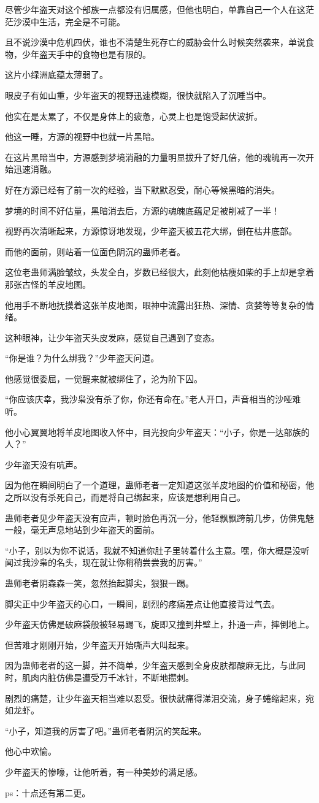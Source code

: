 \begin{this_body}
尽管少年盗天对这个部族一点都没有归属感，但他也明白，单靠自己一个人在这茫茫沙漠中生活，完全是不可能。

且不说沙漠中危机四伏，谁也不清楚生死存亡的威胁会什么时候突然袭来，单说食物，少年盗天手中的食物也是有限的。

这片小绿洲底蕴太薄弱了。

眼皮子有如山重，少年盗天的视野迅速模糊，很快就陷入了沉睡当中。

他实在是太累了，不仅是身体上的疲惫，心灵上也是饱受起伏波折。

他这一睡，方源的视野中也就一片黑暗。

在这片黑暗当中，方源感到梦境消融的力量明显拔升了好几倍，他的魂魄再一次开始迅速消融。

好在方源已经有了前一次的经验，当下默默忍受，耐心等候黑暗的消失。

梦境的时间不好估量，黑暗消去后，方源的魂魄底蕴足足被削减了一半！

视野再次清晰起来，方源惊讶地发现，少年盗天被五花大绑，倒在枯井底部。

而他的面前，则站着一位面色阴沉的蛊师老者。

这位老蛊师满脸皱纹，头发全白，岁数已经很大，此刻他枯瘦如柴的手上却是拿着那张古怪的羊皮地图。

他用手不断地抚摸着这张羊皮地图，眼神中流露出狂热、深情、贪婪等等复杂的情绪。

这种眼神，让少年盗天头皮发麻，感觉自己遇到了变态。

“你是谁？为什么绑我？”少年盗天问道。

他感觉很委屈，一觉醒来就被绑住了，沦为阶下囚。

“你应该庆幸，我沙枭没有杀了你，你还有命在。”老人开口，声音相当的沙哑难听。

他小心翼翼地将羊皮地图收入怀中，目光投向少年盗天：“小子，你是一达部族的人？”

少年盗天没有吭声。

因为他在瞬间明白了一个道理，蛊师老者一定知道这张羊皮地图的价值和秘密，他之所以没有杀死自己，而是将自己绑起来，应该是想利用自己。

蛊师老者见少年盗天没有应声，顿时脸色再沉一分，他轻飘飘跨前几步，仿佛鬼魅一般，毫无声息地站到少年盗天的面前。

“小子，别以为你不说话，我就不知道你肚子里转着什么主意。嘿，你大概是没听闻过我沙枭的名头，现在就让你稍稍尝尝我的厉害。”

蛊师老者阴森森一笑，忽然抬起脚尖，狠狠一踢。

脚尖正中少年盗天的心口，一瞬间，剧烈的疼痛差点让他直接背过气去。

少年盗天仿佛是破麻袋般被轻易踢飞，旋即又撞到井壁上，扑通一声，摔倒地上。

但苦难才刚刚开始，少年盗天开始嘶声大叫起来。

因为蛊师老者的这一脚，并不简单，少年盗天感到全身皮肤都酸麻无比，与此同时，肌肉内脏仿佛是遭受万千冰针，不断地攒刺。

剧烈的痛楚，让少年盗天相当难以忍受。很快就痛得涕泪交流，身子蜷缩起来，宛如龙虾。

“小子，知道我的厉害了吧。”蛊师老者阴沉的笑起来。

他心中欢愉。

少年盗天的惨嚎，让他听着，有一种美妙的满足感。

ps：十点还有第二更。

\end{this_body}

